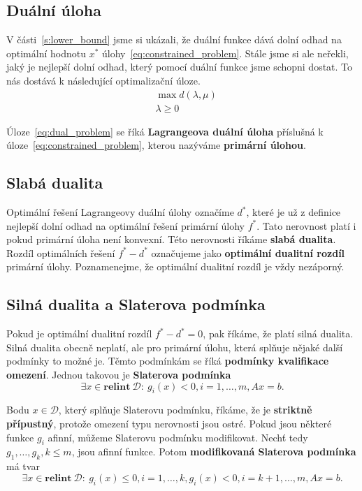 \subsection*{Duální úloha}

V části~\ref{s:lower_bound} jsme si ukázali, že duální funkce dává dolní odhad na optimální hodnotu $x^*$ úlohy~\ref{eq:constrained_problem}. Stále jsme si ale neřekli, jaký je nejlepší dolní odhad, který pomocí duální funkce jsme schopni dostat. To nás dostává k následující optimalizační úloze.
\begin{equation}\label{eq:dual_problem}
    \begin{split}
        &\max d(\lambda, \mu) \\
        &\lambda \geq 0
    \end{split}
\end{equation}

Úloze~\ref{eq:dual_problem} se říká \textbf{Lagrangeova duální úloha} příslušná k úloze~\ref{eq:constrained_problem}, kterou nazýváme \textbf{primární úlohou}.

\subsection*{Slabá dualita}

Optimální řešení Lagrangeovy duální úlohy označíme $d^*$, které je už z definice nejlepší dolní odhad na optimální řešení primární úlohy $f^*$. Tato nerovnost platí i pokud primární úloha není konvexní. Této nerovnosti říkáme \textbf{slabá dualita}. Rozdíl optimálních řešení $f^* - d^*$ označujeme jako \textbf{optimální dualitní rozdíl} primární úlohy. Poznamenejme, že optimální dualitní rozdíl je vždy nezáporný.


\subsection*{Silná dualita a Slaterova podmínka}

Pokud je optimální dualitní rozdíl $f^* - d^* = 0$, pak říkáme, že platí silná dualita. Silná dualita obecně neplatí, ale pro primární úlohu, která splňuje nějaké další podmínky to možné je. Těmto podmínkám se říká \textbf{podmínky kvalifikace omezení}. Jednou takovou je \textbf{Slaterova podmínka}
$$
    \exists x \in \textbf{relint}\ \mathcal{D}:\ g_i(x) < 0, i = 1, \dots, m, Ax = b.
$$

Bodu $x \in \mathcal{D}$, který splňuje Slaterovu podmínku, říkáme, že je \textbf{striktně přípustný}, protože omezení typu nerovnosti jsou ostré. Pokud jsou některé funkce $g_i$ afinní, můžeme Slaterovu podmínku modifikovat. Nechť tedy $g_1, \dots, g_k, k \leq m$, jsou afinní funkce. Potom \textbf{modifikovaná Slaterova podmínka} má tvar
$$
    \exists x \in \textbf{relint}\ \mathcal{D}:\ g_i(x) \leq 0, i = 1, \dots, k, g_i(x) < 0, i = k+1, \dots, m, Ax = b.
$$

